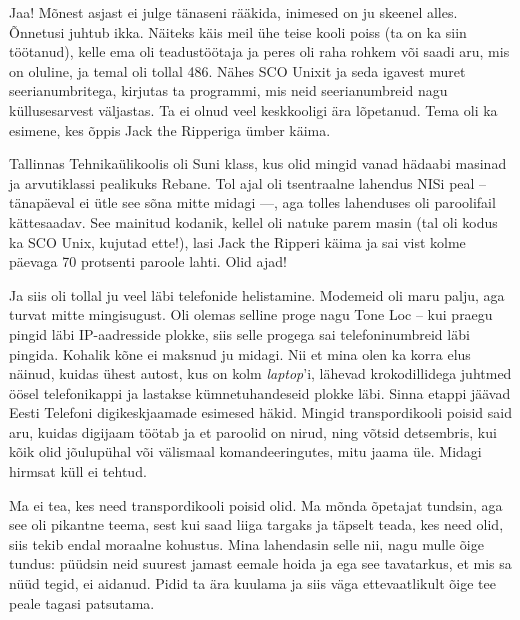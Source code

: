 
Jaa! Mõnest asjast ei julge tänaseni rääkida, inimesed on ju skeenel 
alles. Õnnetusi juhtub ikka. Näiteks käis meil ühe teise kooli poiss (ta on 
ka siin 
töötanud), kelle ema oli teadustöötaja ja peres oli raha rohkem või saadi aru, mis on 
oluline, ja temal oli tollal 486. Nähes SCO Unixit ja seda igavest 
muret seerianumbritega, kirjutas ta programmi, mis neid 
seerianumbreid nagu küllusesarvest väljastas. Ta ei olnud veel keskkooligi ära 
lõpetanud. Tema oli ka esimene, kes õppis Jack the Ripperiga ümber käima. 

Tallinnas Tehnikaülikoolis oli Suni klass, kus olid 
mingid vanad hädaabi masinad ja arvutiklassi pealikuks Rebane. Tol ajal oli
tsentraalne lahendus NISi peal -- tänapäeval ei ütle see sõna mitte midagi ---, 
aga tolles lahenduses oli paroolifail kättesaadav. See mainitud
kodanik, kellel oli natuke parem masin (tal oli kodus ka SCO 
Unix, kujutad ette!), lasi Jack the Ripperi käima ja sai vist kolme päevaga 70 protsenti paroole lahti. Olid ajad!

Ja siis oli tollal ju veel läbi telefonide helistamine. Modemeid oli maru palju, aga 
turvat mitte mingisugust. Oli olemas selline proge nagu Tone Loc -- kui praegu pingid 
läbi IP-aadresside plokke, siis selle progega sai telefoninumbreid läbi pingida. Kohalik kõne ei maksnud ju midagi. Nii et mina 
olen ka korra elus näinud, kuidas ühest autost, kus on kolm \emph{laptop}'i, 
lähevad krokodillidega juhtmed öösel telefonikappi ja lastakse kümnetuhandeseid 
plokke läbi. Sinna etappi jäävad Eesti Telefoni digikeskjaamade esimesed 
häkid. Mingid transpordikooli poisid said aru, kuidas digijaam töötab ja et paroolid on nirud, ning võtsid detsembris, kui kõik olid jõulupühal või 
välismaal komandeeringutes, mitu jaama üle. Midagi hirmsat küll ei tehtud. 


Ma ei tea, kes need transpordikooli poisid olid. Ma mõnda õpetajat 
tundsin, aga see oli pikantne teema, sest kui saad liiga 
targaks ja täpselt teada, kes need olid, siis 
tekib endal moraalne kohustus. Mina lahendasin selle nii, nagu mulle õige 
tundus: püüdsin neid suurest jamast eemale hoida ja ega see tavatarkus, 
et mis sa nüüd tegid, ei aidanud. Pidid ta ära kuulama ja 
siis väga ettevaatlikult õige tee peale tagasi patsutama. 

